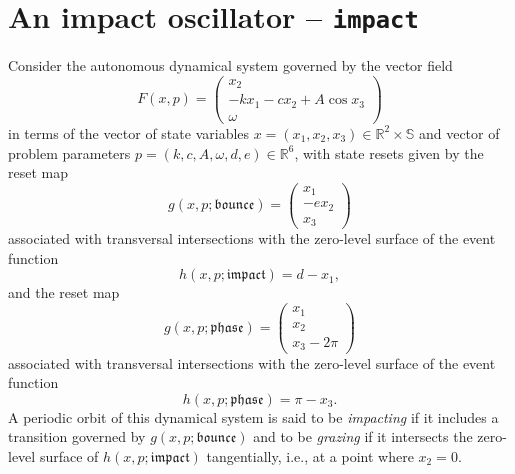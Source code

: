 \section{An impact oscillator -- \texttt{impact}}
Consider the autonomous dynamical system governed by the vector field
\begin{equation}
F(x,p)=\left(\begin{array}{c}x_2\\-kx_1-cx_2+A\cos x_3\\\omega\end{array}\right)
\end{equation}
in terms of the vector of state variables $x=(x_1,x_2,x_3)\in\mathbb{R}^2\times\mathbb{S}$ and vector of problem parameters $p=(k,c,A,\omega,d,e)\in\mathbb{R}^6$, with state resets given by the reset map
\begin{equation}
g(x,p;\mathfrak{bounce})=\left(\begin{array}{c}x_1\\-ex_2\\x_3\end{array}\right)
\end{equation}
associated with transversal intersections with the zero-level surface of the event function
\begin{equation}
h(x,p;\mathfrak{impact})=d-x_1,
\end{equation}
and the reset map
\begin{equation}
g(x,p;\mathfrak{phase})=\left(\begin{array}{c}x_1\\x_2\\x_3-2\pi\end{array}\right)
\end{equation}
associated with transversal intersections with the zero-level surface of the event function
\begin{equation}
h(x,p;\mathfrak{phase})=\pi-x_3.
\end{equation}
A periodic orbit of this dynamical system is said to be \emph{impacting} if it includes a transition governed by $g(x,p;\mathfrak{bounce})$ and to be \emph{grazing} if it intersects the zero-level surface of $h(x,p;\mathfrak{impact})$ tangentially, i.e., at a point where $x_2=0$.

